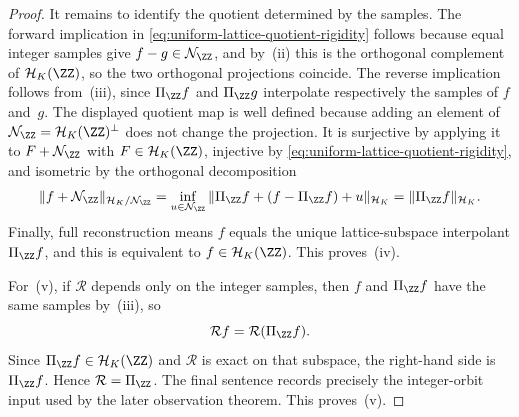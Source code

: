 \begin{proof}
It remains to identify the quotient determined by the samples.  The forward
implication in \eqref{eq:uniform-lattice-quotient-rigidity} follows because
equal integer samples give $f-g\in\mathcal N_{\ZZ}$, and by~(ii) this is the
orthogonal complement of $\mathcal H_K(\ZZ)$, so the two orthogonal
projections coincide.  The reverse implication follows from~(iii), since
$\Pi_{\ZZ}f$ and $\Pi_{\ZZ}g$ interpolate respectively the samples of
$f$ and~$g$.
The displayed quotient map is well defined because adding an element of
$\mathcal N_{\ZZ}=\mathcal H_K(\ZZ)^\perp$ does not change the projection.  It is
surjective by applying it to $F+\mathcal N_{\ZZ}$ with $F\in\mathcal H_K(\ZZ)$,
injective by \eqref{eq:uniform-lattice-quotient-rigidity}, and isometric by
the orthogonal decomposition
\[
\|f+\mathcal N_{\ZZ}\|_{\mathcal H_K/\mathcal N_{\ZZ}}
=\inf_{u\in\mathcal N_{\ZZ}}
\|\Pi_{\ZZ}f+(f-\Pi_{\ZZ}f)+u\|_{\mathcal H_K}
=\|\Pi_{\ZZ}f\|_{\mathcal H_K}.
\]
Finally, full reconstruction means $f$ equals the unique lattice-subspace
interpolant $\Pi_{\ZZ}f$, and this is equivalent to
$f\in\mathcal H_K(\ZZ)$.  This proves~(iv).

For~(v), if $\mathcal R$ depends only on the integer samples, then $f$ and
$\Pi_{\ZZ}f$ have the same samples by~(iii), so
\[
\mathcal Rf=\mathcal R(\Pi_{\ZZ}f).
\]
Since $\Pi_{\ZZ}f\in\mathcal H_K(\ZZ)$ and $\mathcal R$ is exact on that
subspace, the right-hand side is $\Pi_{\ZZ}f$.  Hence
$\mathcal R=\Pi_{\ZZ}$.  The final sentence records precisely the
integer-orbit input used by the later observation theorem.
This proves~(v).
\end{proof}
\fi

